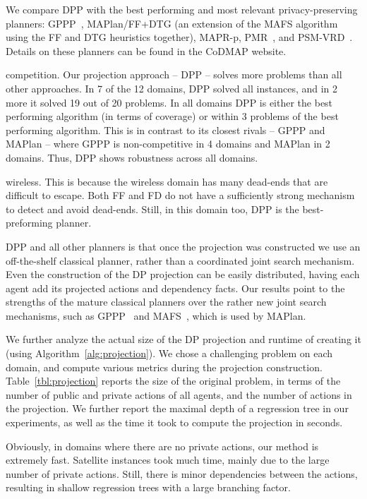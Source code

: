 \documentclass[letterpaper]{article}
\theoremstyle{definition}
\begin{document}
We compare DPP with the best performing and most relevant privacy-preserving planners: GPPP~\cite{maliah2015privacy}, MAPlan/FF+DTG (an extension of the MAFS algorithm~\cite{nissim2014distributed} using the FF and DTG heuristics together), MAPR-p, PMR~\cite{luis2014planMerging}, and PSM-VRD~\cite{tovzivcka2014generating,jakubuv2015multiagent}. Details on these planners can be found in the CoDMAP website.

 competition. Our projection approach -- DPP -- solves more problems than all other approaches. In 7 of the 12 domains, DPP solved all instances, and in 2 more it solved 19 out of 20 problems. In all domains DPP is either the best performing algorithm (in terms of coverage) or within 3 problems of the best performing algorithm. This is in contrast to its closest rivals -- GPPP and MAPlan -- where GPPP is non-competitive in 4 domains and MAPlan in 2 domains. Thus, DPP shows robustness across all domains.


 wireless. This is because the wireless domain has many dead-ends that are difficult to escape. Both FF and FD do not have a sufficiently strong mechanism to detect and avoid dead-ends. Still, in this domain too, DPP is the best-preforming planner.

 DPP and all other planners is that once the projection was constructed we use an off-the-shelf classical planner, rather than a coordinated joint search mechanism. Even the construction of the DP projection can be easily distributed, having each agent add its projected actions and dependency facts.
Our results point to the strengths of the mature classical planners over the rather new joint search mechanisms, such as GPPP~\cite{maliah2014privacyPreserving} and MAFS~\cite{nissim2014distributed}, which is used by MAPlan.


We further analyze the actual size of the DP projection and runtime of creating it (using Algorithm~\ref{alg:projection}). We chose a challenging problem on each domain, and compute various metrics during the projection construction.  Table~\ref{tbl:projection} reports the size of the original problem, in terms of the number of public and private actions of all agents, and the number of actions in the projection. We further report the maximal depth of a regression tree in our experiments, as well as the time it took to compute the projection in seconds.

Obviously, in domains where there are no private actions, our method is extremely fast.
Satellite instances took much time, mainly due to the large number of private actions. Still, there is minor dependencies between the actions, resulting in shallow regression trees with a large branching factor.
\end{document}
